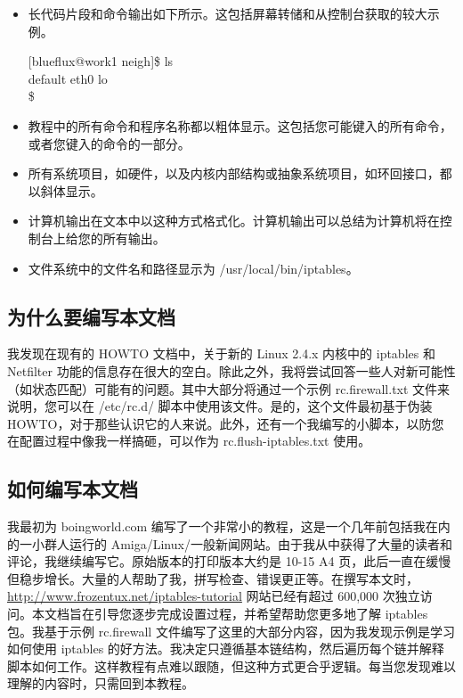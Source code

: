 \documentclass[12pt,UTF8]{ctexbook}
\begin{document}
\begin{itemize}
  \item 长代码片段和命令输出如下所示。这包括屏幕转储和从控制台获取的较大示例。
  
  [blueflux@work1 neigh]\$ ls \\
  default  eth0  lo \\
  [blueflux@work1 neigh]\$ 
  
  \item 教程中的所有命令和程序名称都以粗体显示。这包括您可能键入的所有命令，或者您键入的命令的一部分。
  
  \item 所有系统项目，如硬件，以及内核内部结构或抽象系统项目，如环回接口，都以斜体显示。
  
  \item 计算机输出在文本中以这种方式格式化。计算机输出可以总结为计算机将在控制台上给您的所有输出。
  
  \item 文件系统中的文件名和路径显示为 /usr/local/bin/iptables。
\end{itemize}

\subsection{为什么要编写本文档}
我发现在现有的 HOWTO 文档中，关于新的 Linux 2.4.x 内核中的 iptables 和 Netfilter 功能的信息存在很大的空白。除此之外，我将尝试回答一些人对新可能性（如状态匹配）可能有的问题。其中大部分将通过一个示例 rc.firewall.txt 文件来说明，您可以在 /etc/rc.d/ 脚本中使用该文件。是的，这个文件最初基于伪装 HOWTO，对于那些认识它的人来说。此外，还有一个我编写的小脚本，以防您在配置过程中像我一样搞砸，可以作为 rc.flush-iptables.txt 使用。

\subsection{如何编写本文档}
我最初为 boingworld.com 编写了一个非常小的教程，这是一个几年前包括我在内的一小群人运行的 Amiga/Linux/一般新闻网站。由于我从中获得了大量的读者和评论，我继续编写它。原始版本的打印版本大约是 10-15 A4 页，此后一直在缓慢但稳步增长。大量的人帮助了我，拼写检查、错误更正等。在撰写本文时，\url{http://www.frozentux.net/iptables-tutorial} 网站已经有超过 600,000 次独立访问。本文档旨在引导您逐步完成设置过程，并希望帮助您更多地了解 iptables 包。我基于示例 rc.firewall 文件编写了这里的大部分内容，因为我发现示例是学习如何使用 iptables 的好方法。我决定只遵循基本链结构，然后遍历每个链并解释脚本如何工作。这样教程有点难以跟随，但这种方式更合乎逻辑。每当您发现难以理解的内容时，只需回到本教程。
\end{document}
